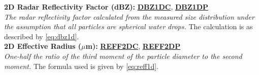 \begin{hangparagraphs}
\textbf{2D Radar Reflectivity Factor (dBZ):}\textbf{
}\textbf{\uline{DBZ1DC}}, \textbf{\uline{DBZ1DP}}\\
\emph{The radar reflectivity factor
calculated from the measured size distribution under the assumption
that all particles are spherical water drops. }The calculation is
as described by\emph{ }\eqref{eq:dbz1d}.\\

\textbf{2D Effective Radius ($\mu$m):}\textbf{
}\textbf{\uline{REFF2DC}},
\textbf{\uline{REFF2DP}}\\
\emph{One-half the ratio of the third moment
of the particle diameter to the second moment. }The formula used is
given by \eqref{eq:reff1d}.\label{punch:5-6}\\
 
\end{hangparagraphs}


